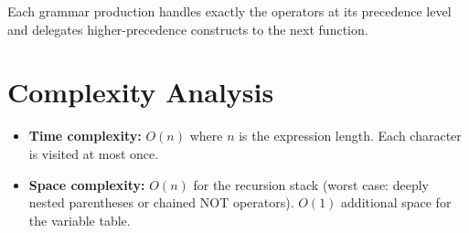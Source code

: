 \documentclass[11pt,a4paper]{article}
\begin{document}
Each grammar production handles exactly the operators at its precedence level and
delegates higher-precedence constructs to the next function.

\section{Complexity Analysis}

\begin{itemize}
  \item \textbf{Time complexity:} $O(n)$ where $n$ is the expression length.
        Each character is visited at most once.
  \item \textbf{Space complexity:} $O(n)$ for the recursion stack (worst case:
        deeply nested parentheses or chained NOT operators). $O(1)$ additional space
        for the variable table.
\end{itemize}
\end{document}
